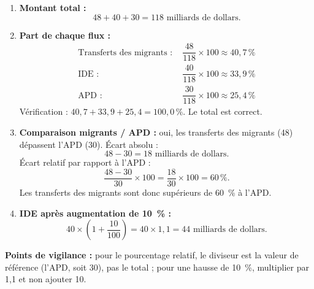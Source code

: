 \documentclass[11pt]{article}
\begin{document}
\begin{corrige}
\begin{enumerate}
\item \textbf{Montant total :}
\[ 48 + 40 + 30 = 118 \text{ milliards de dollars.} \]
\item \textbf{Part de chaque flux :}
\begin{align*}
\text{Transferts des migrants : } & \dfrac{48}{118}\times 100 \approx 40,7\,\% \\
\text{IDE : } & \dfrac{40}{118}\times 100 \approx 33,9\,\% \\
\text{APD : } & \dfrac{30}{118}\times 100 \approx 25,4\,\%
\end{align*}
Vérification : $40,7 + 33,9 + 25,4 = 100,0\,\%$. Le total est correct.
\item \textbf{Comparaison migrants / APD :} oui, les transferts des migrants (48) dépassent l'APD (30). Écart absolu :
\[ 48 - 30 = 18 \text{ milliards de dollars.} \]
Écart relatif par rapport à l'APD :
\[ \dfrac{48-30}{30}\times 100 = \dfrac{18}{30}\times 100 = 60\,\%. \]
Les transferts des migrants sont donc supérieurs de 60~\% à l'APD.
\item \textbf{IDE après augmentation de 10~\% :}
\[ 40 \times \left(1 + \dfrac{10}{100}\right) = 40 \times 1,1 = 44 \text{ milliards de dollars.} \]
\end{enumerate}
\textbf{Points de vigilance :} pour le pourcentage relatif, le diviseur est la valeur de référence (l'APD, soit 30), pas le total ; pour une hausse de 10~\%, multiplier par 1,1 et non ajouter 10.
\end{corrige}
\end{document}
